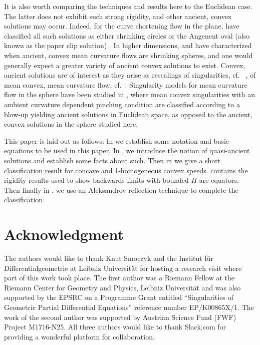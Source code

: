\documentclass{amsart}
\begin{document}
It is also worth comparing the techniques and results here to the Euclidean case. The latter does not exhibit such strong rigidity, and other ancient, convex solutions may occur. Indeed, for the curve shortening flow in the plane, \cite{DaskalopoulosHamiltonSesum:2010} have classified all such solutions as either shrinking circles or the Angenent oval (also known as the paper clip solution) \cite{Angenent:1992}. In higher dimensions, \cite{HuiskenSinestrari:05/2014} and \cite{HaslhoferHershkovits:08/2013} have characterized when ancient, convex mean curvature flows are shrinking spheres, and one would generally expect a greater variety of ancient convex solutions to exist. Convex, ancient solutions are of interest as they arise as rescalings of singularities, cf.~ \cite{HuiskenSinestrari:01/1999}, of mean convex, mean curvature flow, cf.~\cite{HuiskenSinestrari:09/1999, White:10/2002}. Singularity models for mean curvature flow in the sphere have been studied in \cite{Nguyen:2015}, where mean convex singularities with an ambient curvature dependent pinching condition are classified according to a blow-up yielding ancient solutions in Euclidean space, as opposed to the ancient, convex solutions in the sphere studied here.

This paper is laid out as follows: In  we establish some notation and basic equations to be used in this paper. In , we introduce the notion of quasi-ancient solutions and establish some facts about such. Then in  we give a short classification result for concave and 1-homogeneous convex speeds.  contains the rigidity results used to show backwards limits with bounded \(H\) are equators. Then finally in , we use an Aleksandrov reflection technique to complete the classification.

\section*{Acknowledgment}
The authors would like to thank Knut Smoczyk and the Institut f\"{u}r Differentialgeometrie at Leibniz Universität for hosting a research visit where part of this work took place. The first author was a Riemann Fellow at the Riemann Center for Geometry and Physics, Leibniz Universit\"{a}t and was also supported by the EPSRC on a Programme Grant entitled ``Singularities of Geometric Partial Differential Equations'' reference number EP/K00865X/1. The work of the second author was supported by Austrian Science Fund (FWF) Project M1716-N25. All three authors would like to thank Slack.com for providing a wonderful platform for collaboration.
\end{document}
